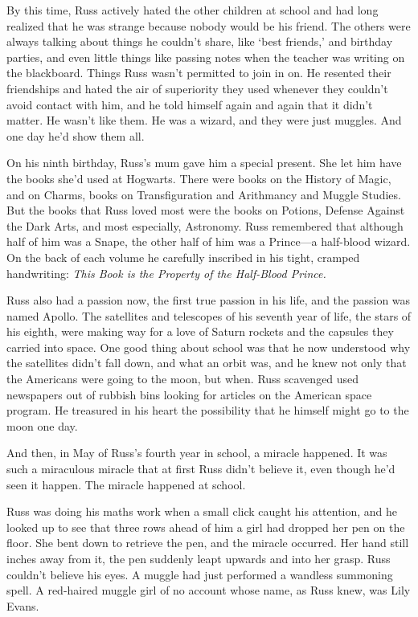 By this time, Russ actively hated the other children at school and had long realized that he was strange because nobody would be his friend. The others were always talking about things he couldn't share, like `best friends,' and birthday parties, and even little things like passing notes when the teacher was writing on the blackboard. Things Russ wasn't permitted to join in on. He resented their friendships and hated the air of superiority they used whenever they couldn't avoid contact with him, and he told himself again and again that it didn't matter. He wasn't like them. He was a wizard, and they were just muggles. And one day he'd show them all.

On his ninth birthday, Russ's mum gave him a special present. She let him have the books she'd used at Hogwarts. There were books on the History of Magic, and on Charms, books on Transfiguration and Arithmancy and Muggle Studies. But the books that Russ loved most were the books on Potions, Defense Against the Dark Arts, and most especially, Astronomy. Russ remembered that although half of him was a Snape, the other half of him was a Prince—a half-blood wizard. On the back of each volume he carefully inscribed in his tight, cramped handwriting: \emph{This Book is the Property of the Half-Blood Prince.}

Russ also had a passion now, the first true passion in his life, and the passion was named Apollo. The satellites and telescopes of his seventh year of life, the stars of his eighth, were making way for a love of Saturn rockets and the capsules they carried into space. One good thing about school was that he now understood why the satellites didn't fall down, and what an orbit was, and he knew not only that the Americans were going to the moon, but when. Russ scavenged used newspapers out of rubbish bins looking for articles on the American space program. He treasured in his heart the possibility that he himself might go to the moon one day.

And then, in May of Russ's fourth year in school, a miracle happened. It was such a miraculous miracle that at first Russ didn't believe it, even though he'd seen it happen. The miracle happened at school.

Russ was doing his maths work when a small click caught his attention, and he looked up to see that three rows ahead of him a girl had dropped her pen on the floor. She bent down to retrieve the pen, and the miracle occurred. Her hand still inches away from it, the pen suddenly leapt upwards and into her grasp. Russ couldn't believe his eyes. A muggle had just performed a wandless summoning spell. A red-haired muggle girl of no account whose name, as Russ knew, was Lily Evans.
